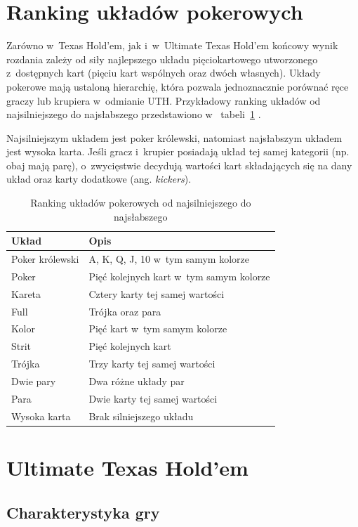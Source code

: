 \section{Ranking układów pokerowych}

Zarówno w~Texas Hold’em, jak i~w~Ultimate Texas Hold’em końcowy wynik rozdania zależy od siły
najlepszego układu pięciokartowego utworzonego z~dostępnych kart (pięciu kart wspólnych oraz dwóch własnych). Układy
pokerowe mają ustaloną hierarchię, która pozwala jednoznacznie porównać ręce graczy lub krupiera w~odmianie UTH.
Przykładowy ranking układów od
najsilniejszego do najsłabszego przedstawiono w~
tabeli~\ref{tab:poker_hand_ranking} \cite{tulalip_uth_rules}.

Najsilniejszym układem jest poker królewski, natomiast najsłabszym układem
jest wysoka karta. Jeśli gracz i~krupier posiadają układ tej samej
kategorii (np. obaj mają parę), o~zwycięstwie decydują wartości kart
składających się na dany układ oraz karty dodatkowe (ang. \emph{kickers}).

\begin{table}[h]
\centering
\caption{Ranking układów pokerowych od najsilniejszego do najsłabszego}
\label{tab:poker_hand_ranking}
\begin{tabular}{ll}
\toprule
Układ & Opis \\
\midrule
Poker królewski & A, K, Q, J, 10 w~tym samym kolorze \\
Poker & Pięć kolejnych kart w~tym samym kolorze \\
Kareta & Cztery karty tej samej wartości \\
Full & Trójka oraz para \\
Kolor & Pięć kart w~tym samym kolorze \\
Strit & Pięć kolejnych kart \\
Trójka & Trzy karty tej samej wartości \\
Dwie pary & Dwa różne układy par \\
Para & Dwie karty tej samej wartości \\
Wysoka karta & Brak silniejszego układu \\
\bottomrule
\end{tabular}
\end{table}

\section{Ultimate Texas Hold’em}

\subsection{Charakterystyka gry}

